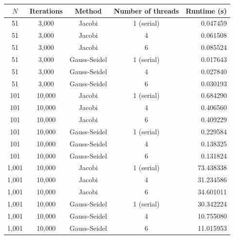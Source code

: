 \begin{questions}
\begin{solution}
 	\begin{center}
    \begin{tabular}{|c|c|c|c|r|}
    \hline
    $N$ & Iterations & Method & Number of threads & Runtime (s) \\
    \hline\hline
    51 & 3,000 & Jacobi & 1 (serial) & 0.047459 \\ 
    \hline
    51 & 3,000 & Jacobi & 4 & 0.061508 \\ 
    \hline
    51 & 3,000 & Jacobi & 6 & 0.085524 \\ 
    \hline
    51 & 3,000 & Gauss-Seidel & 1 (serial) & 0.017643 \\
    \hline
    51 & 3,000 & Gauss-Seidel & 4 & 0.027840 \\
    \hline
    51 & 3,000 & Gauss-Seidel & 6 & 0.030193 \\
    \hline\hline
    101 & 10,000 & Jacobi & 1 (serial) & 0.684290 \\ 
    \hline
    101 & 10,000 & Jacobi & 4 & 0.406560 \\ 
    \hline
    101 & 10,000 & Jacobi & 6 & 0.409229 \\ 
    \hline
    101 & 10,000 & Gauss-Seidel & 1 (serial) & 0.229584 \\
    \hline
    101 & 10,000 & Gauss-Seidel & 4 & 0.138325 \\
    \hline
    101 & 10,000 & Gauss-Seidel & 6 & 0.131824 \\
    \hline\hline
    1,001 & 10,000 & Jacobi & 1 (serial) & 73.438338 \\ 
    \hline
    1,001 & 10,000 & Jacobi & 4 & 31.234586 \\ 
    \hline
    1,001 & 10,000 & Jacobi & 6 & 34.601011 \\ 
    \hline
    1,001 & 10,000 & Gauss-Seidel & 1 (serial) & 30.342224 \\
    \hline
    1,001 & 10,000 & Gauss-Seidel & 4 & 10.755080 \\
    \hline
    1,001 & 10,000 & Gauss-Seidel & 6 & 11.015953 \\
    \hline
    \end{tabular}
    \label{tab:2DLaplaceRuntime}
    \end{center}
    

\end{solution}
\end{questions}
